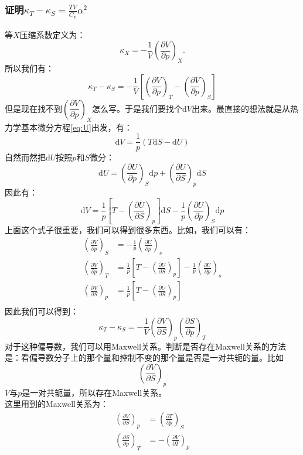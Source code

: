 \documentclass[UTF8]{ctexart}
\newcommand{\md}{\mathrm{d}}
\numberwithin{equation}{subsection}
\begin{document}
\subsubsection{证明$\kappa_T-\kappa_S=\frac{TV}{C_p}\alpha^2$}
\noindent 等$X$压缩系数定义为：
\[\kappa_X=-\frac{1}{V}\left(\frac{\partial V}{\partial p}\right)_{X}.\]
所以我们有：
\begin{equation*}
\kappa_T-\kappa_S=-\frac{1}{V}\left[\left(\frac{\partial V}{\partial p}\right)_{T}-\left(\frac{\partial V}{\partial p}\right)_{S}\right]
\end{equation*}
但是现在找不到$\left(\dfrac{\partial V}{\partial p}\right)_{X}$怎么写。于是我们要找个$\md V$出来。最直接的想法就是从热力学基本微分方程\ref{eq:U}出发，有：
\[\md V=\frac{1}{p}\left(T\md S-\md U\right)\]
自然而然把$\md U$按照$p$和$S$微分：
\[\md U=\left(\frac{\partial U}{\partial p}\right)_{S}\md p+\left(\frac{\partial U}{\partial S}\right)_{p}\md S\]
因此有：
\begin{equation*}
\md V=\frac{1}{p}\left[T-\left(\frac{\partial U}{\partial S}\right)_{p}\right]\md S-\frac{1}{p}\left(\frac{\partial U}{\partial p}\right)_{S}\md p
\end{equation*}
上面这个式子很重要，我们可以得到很多东西。比如，我们可以有：
\begin{align*}
\left(\frac{\partial V}{\partial p}\right)_{S}&=-\frac{1}{p}\left(\frac{\partial U}{\partial p}\right)_{s}\\
\left(\frac{\partial V}{\partial p}\right)_{T}&=\frac{1}{p}\left[T-\left(\frac{\partial U}{\partial S}\right)_{p}\right]-\frac{1}{p}\left(\frac{\partial U}{\partial p}\right)_{s}\\
\left(\frac{\partial V}{\partial S}\right)_{p}&=\frac{1}{p}\left[T-\left(\frac{\partial U}{\partial S}\right)_{p}\right]\\
\end{align*}
因此我们可以得到：
\begin{equation}\label{eq:2.2.1}
\kappa_T-\kappa_S=-\frac{1}{V}\left(\frac{\partial V}{\partial S}\right)_{p}\left(\frac{\partial S}{\partial p}\right)_{T}
\end{equation}
对于这种偏导数，我们可以用Maxwell关系。判断是否存在Maxwell关系的方法是：看偏导数分子上的那个量和控制不变的那个量是否是一对共轭的量。比如
\[ \left(\frac{\partial V}{\partial S}\right)_{p} \]
$V$与$p$是一对共轭量，所以存在Maxwell关系。\\
这里用到的Maxwell关系为：
\begin{align*}
\left(\frac{\partial V}{\partial S}\right)_{p}&=\left(\frac{\partial T}{\partial p}\right)_{S}\\
\left(\frac{\partial S}{\partial p}\right)_{T}&=-\left(\frac{\partial V}{\partial T}\right)_{p}\\
\end{align*}
\end{document}
